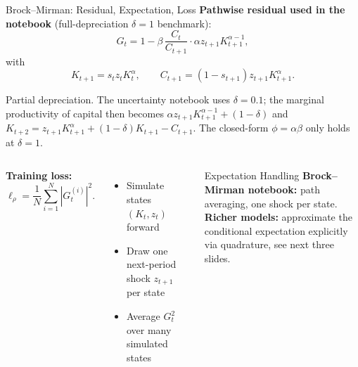 \documentclass[aspectratio=169,11pt]{beamer}
\newcommand{\emphc}[1]{\textcolor{harvardcrimson}{#1}}
\begin{document}
\begin{frame}{Brock--Mirman: Residual, Expectation, Loss}
\textbf{Pathwise residual used in the notebook} (full-depreciation $\delta=1$ benchmark):
\[
G_t = 1 - \beta \, \frac{C_t}{C_{t+1}} \cdot \alpha z_{t+1} K_{t+1}^{\alpha-1},
\]
with
\[
K_{t+1} = s_t z_t K_t^\alpha, \qquad
C_{t+1} = (1-s_{t+1}) z_{t+1} K_{t+1}^\alpha.
\]

\vspace{-0.2em}
{\scriptsize\emphc{Partial depreciation.}  The uncertainty notebook uses $\delta=0.1$; the marginal productivity of capital then becomes $\alpha z_{t+1} K_{t+1}^{\alpha-1} + (1-\delta)$ and $K_{t+2} = z_{t+1} K_{t+1}^{\alpha} + (1-\delta) K_{t+1} - C_{t+1}$.  The closed-form $\phi = \alpha\beta$ only holds at $\delta=1$.}

\vspace{0.3em}
\begin{columns}[T]
\textbf{Training loss:}
\[
\ell_\rho = \frac{1}{N}\sum_{i=1}^{N} |G_t^{(i)}|^2.
\]

\begin{itemize}
    \setlength{\itemsep}{1pt}
    \item Simulate states $(K_t,z_t)$ forward
    \item Draw one next-period shock $z_{t+1}$ per state
    \item Average $G_t^2$ over many simulated states
\end{itemize}

\begin{block}{Expectation Handling}
\small
\textbf{Brock--Mirman notebook:} path averaging, one shock per state.\\[2pt]
\textbf{Richer models:} approximate the conditional expectation explicitly via \emphc{quadrature}, see next three slides.
\end{block}
\end{columns}
\end{frame}

\end{document}
